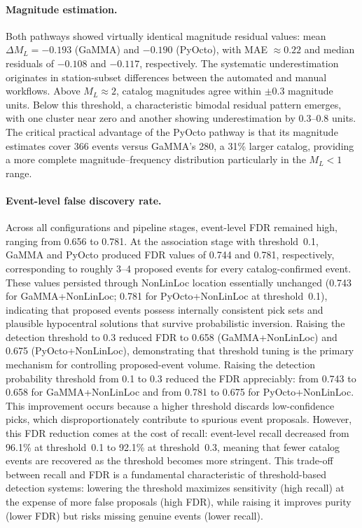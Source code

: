 \paragraph{Magnitude estimation.}
Both pathways showed virtually identical magnitude residual values:
mean~$\Delta M_L = -0.193$ (GaMMA) and $-0.190$ (PyOcto), with MAE
$\approx 0.22$ and median residuals of $-0.108$ and $-0.117$, respectively.
The systematic underestimation originates in station-subset differences between
the automated and manual workflows. Above $M_L \approx 2$, catalog magnitudes
agree within $\pm 0.3$ magnitude units. Below this threshold, a characteristic
bimodal residual pattern emerges, with one cluster near zero and another
showing underestimation by 0.3--0.8 units. The critical practical advantage of
the PyOcto pathway is that its magnitude estimates cover 366 events versus
GaMMA's 280, a 31\% larger catalog, providing a more complete
magnitude--frequency distribution particularly in the $M_L < 1$ range.

\paragraph{Event-level false discovery rate.}
Across all configurations and pipeline stages, event-level \ac{FDR} remained
high, ranging from 0.656 to 0.781. At the association stage with threshold~0.1,
GaMMA and PyOcto produced \ac{FDR} values of 0.744 and 0.781, respectively,
corresponding to roughly 3--4 proposed events for every catalog-confirmed
event. These values persisted through NonLinLoc location essentially
unchanged (0.743 for GaMMA+NonLinLoc; 0.781 for PyOcto+NonLinLoc at
threshold~0.1), indicating that proposed events possess internally consistent
pick sets and plausible hypocentral solutions that survive probabilistic
inversion. Raising the detection threshold to 0.3 reduced \ac{FDR} to 0.658
(GaMMA+NonLinLoc) and 0.675 (PyOcto+NonLinLoc), demonstrating that threshold
tuning is the primary mechanism for controlling proposed-event volume.
Raising the detection probability threshold from 0.1 to 0.3 reduced the
\ac{FDR} appreciably: from 0.743 to 0.658 for GaMMA+NonLinLoc and from 0.781
to 0.675 for PyOcto+NonLinLoc. This improvement occurs because a higher
threshold discards low-confidence picks, which disproportionately contribute to
spurious event proposals. However, this \ac{FDR} reduction comes at the cost
of recall: event-level recall decreased from 96.1\% at threshold~0.1 to 92.1\%
at threshold~0.3, meaning that fewer catalog events are recovered as the
threshold becomes more stringent. This trade-off between recall and \ac{FDR}
is a fundamental characteristic of threshold-based detection systems: lowering
the threshold maximizes sensitivity (high recall) at the expense of more false
proposals (high \ac{FDR}), while raising it improves purity (lower \ac{FDR})
but risks missing genuine events (lower recall).

